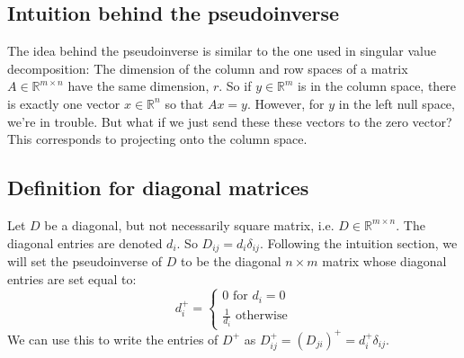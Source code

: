 \documentclass[12pt, a4paper]{article}
\numberwithin{equation}{section}
\begin{document}
\subsection{Intuition behind the pseudoinverse}
The idea behind the pseudoinverse is similar to the one used in singular value decomposition: The dimension of the column and row spaces of a matrix $A\in\mathbb{R}^{m\times n}$ have the same dimension, $r$. So if $y\in\mathbb{R}^m$ is in the column space, there is exactly one vector $x\in\mathbb{R}^n$ so that $Ax=y$. However, for $y$ in the left null space, we're in trouble. But what if we just send these these vectors to the zero vector? This corresponds to projecting onto the column space.

\subsection{Definition for diagonal matrices}
Let $D$ be a diagonal, but not necessarily square matrix, i.e. $D\in\mathbb{R}^{m\times n}$. The diagonal entries are denoted $d_i$. So $D_{ij}=d_i\delta_{ij}$. Following the intuition section, we will set the pseudoinverse of $D$ to be the diagonal $n\times m$ matrix whose diagonal entries are set equal to:
\begin{equation}
d_i^+=
\begin{cases}
0\textrm{ for }d_i=0 \\
\frac{1}{d_i}\textrm{ otherwise}
\end{cases}
\end{equation}
We can use this to write the entries of $D^+$ as $D^+_{ij}=(D_{ji})^+=d_i^+\delta_{ij}$.
\end{document}
